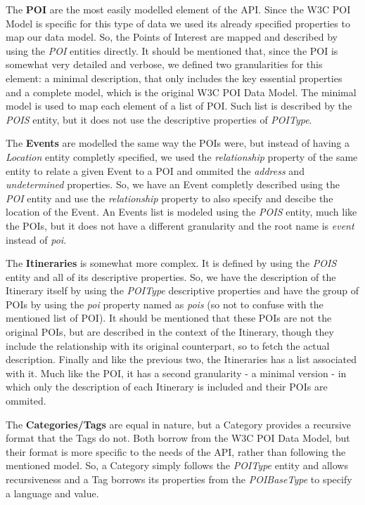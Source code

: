 \documentclass[times]{ettauth}
\begin{document}
The \textbf{\acf{POI}} are the most easily modelled element of the API. Since the W3C POI Model is specific for this type of data we used its already specified properties to map our data model. So, the Points of Interest are mapped and described by using the \textit{POI} entities directly. It should be mentioned that, since the \ac{POI} is somewhat very detailed and verbose, we defined two granularities for this element: a minimal description, that only includes the key essential properties and a complete model, which is the original W3C POI Data Model. The minimal model is used to map each element of a list of \ac{POI}. Such list is described by the \textit{POIS} entity, but it does not use the descriptive properties of \textit{POIType}.

The \textbf{Events} are modelled the same way the \acp{POI} were, but instead of having a \textit{Location} entity completly specified, we used the \textit{relationship} property of the same entity to relate a given Event to a \ac{POI} and ommited the \textit{address} and \textit{undetermined} properties. So, we have an Event completly described using the \textit{POI} entity and use the \textit{relationship} property to also specify and descibe the location of the Event. An Events list is modeled using the \textit{POIS} entity, much like the \acp{POI}, but it does not have a different granularity and the root name is \textit{event} instead of \textit{poi}.

The \textbf{Itineraries} is somewhat more complex. It is defined by using the \textit{POIS} entity and all of its descriptive properties. So, we have the description of the Itinerary itself by using the \textit{POIType} descriptive properties and have the group of \acp{POI} by using the \textit{poi} property named as \textit{pois} (so not to confuse with the mentioned list of \ac{POI}). It should be mentioned that these \acp{POI} are not the original \acp{POI}, but are described in the context of the Itinerary, though they include the relationship with its original counterpart, so to fetch the actual description. Finally and like the previous two, the Itineraries has a list associated with it. Much like the \ac{POI}, it has a second granularity - a minimal version - in which only the description of each Itinerary is included and their \acp{POI} are ommited.

The \textbf{Categories/Tags} are equal in nature, but a Category provides a recursive format that the Tags do not. Both borrow from the W3C POI Data Model, but their format is more specific to the needs of the API, rather than following the mentioned model. So, a Category simply follows the \textit{POIType} entity and allows recursiveness and a Tag borrows its properties from the \textit{POIBaseType} to specify a language and value.
\end{document}
